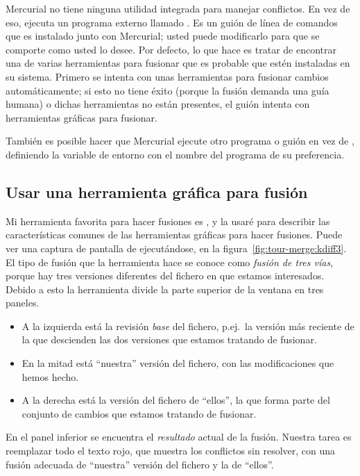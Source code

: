 Mercurial no tiene ninguna utilidad integrada para manejar conflictos.
En vez de eso, ejecuta un programa externo llamado .
Es un guión de línea de comandos que es instalado junto con Mercurial;
usted puede modificarlo para que se comporte como usted lo desee. Por
defecto, lo que hace es tratar de encontrar una de varias herramientas
para fusionar que es probable que estén instaladas en su sistema.
Primero se intenta con unas herramientas para fusionar cambios
automáticamente; si esto no tiene éxito (porque la fusión demanda
una guía humana) o dichas herramientas no están presentes, el guión
intenta con herramientas gráficas para fusionar.

También es posible hacer que Mercurial ejecute otro programa o guión
en vez de , definiendo la variable de entorno
 con el nombre del programa de su preferencia.

\subsection{Usar una herramienta gráfica para fusión}

Mi herramienta favorita para hacer fusiones es , y la
usaré para describir las características comunes de las herramientas
gráficas para hacer fusiones. Puede ver una captura de pantalla de
 ejecutándose, en la
figura~\ref{fig:tour-merge:kdiff3}.  El tipo de fusión que la
herramienta hace se conoce como \emph{fusión de tres vías}, porque hay
tres versiones diferentes del fichero en que estamos interesados.
Debido a esto la herramienta divide la parte superior de la ventana en
tres paneles.
\begin{itemize}
\item A la izquierda está la revisión \emph{base} del fichero, p.ej.~la
    versión más reciente de la que descienden las dos versiones que
    estamos tratando de fusionar.
\item En la mitad está ``nuestra'' versión del fichero, con las
    modificaciones que hemos hecho.
\item A la derecha está la versión del fichero de ``ellos'', la que
    forma parte del conjunto de cambios que estamos tratando de
    fusionar.
\end{itemize}
En el panel inferior se encuentra el \emph{resultado} actual de la
fusión. Nuestra tarea es reemplazar todo el texto rojo, que muestra
los conflictos sin resolver, con una fusión adecuada de ``nuestra''
versión del fichero y la de ``ellos''.

